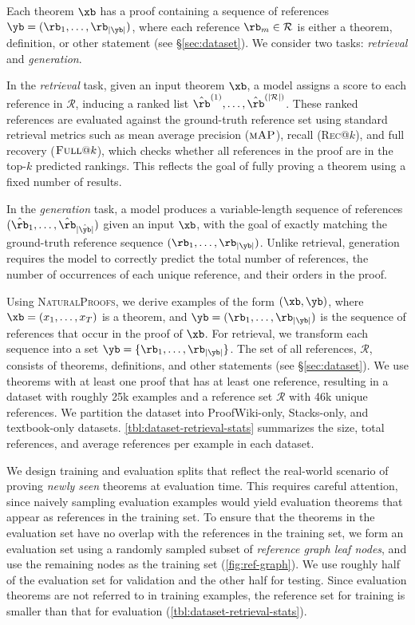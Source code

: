 Each theorem $\xb$ has a proof containing a sequence of references $\yb=(\rb_1,\ldots,\rb_{|\yb|})$, where each reference $\rb_m\in \mathcal{R}$ is either a theorem, definition, or other statement (see \S\ref{sec:dataset}).
We consider two tasks: \textit{retrieval} and \textit{generation}.

In the \textit{retrieval} task, given an input theorem $\xb$, a model assigns a score to each reference in $\mathcal{R}$, inducing a ranked list $\hat{\rb}^{(1)},\ldots,\hat{\rb}^{(|\mathcal{R}|)}$.
These ranked references are evaluated against the ground-truth reference set using standard retrieval metrics such as mean average precision ($\textsc{mAP}$), recall (\textsc{Rec}@$k$), and full recovery ($\textsc{Full}@k$), which checks whether all references in the proof are in the top-$k$ predicted rankings. 
This reflects the goal of fully proving a theorem using a fixed number of results.

In the \textit{generation} task, a model produces a variable-length sequence of references $(\hat{\rb}_1,\ldots,\hat{\rb}_{|\hat{\yb}|})$ given an input $\xb$, with the goal of exactly matching the ground-truth reference sequence $(\rb_1,\ldots,\rb_{|\yb|})$.
Unlike retrieval, generation requires the model to correctly predict the total number of references, the number of occurrences of each unique reference, and their orders in the proof.

Using \textsc{NaturalProofs}, we derive examples of the  form $(\xb,\yb)$, where $\xb=(x_1,\ldots,x_T)$ is a theorem, and $\yb=(\rb_1,\ldots,\rb_{|\yb|})$ is the sequence of references that occur in the proof of $\xb$.
For retrieval, we transform each sequence into a set $\yb=\{\rb_1,\ldots,\rb_{|\yb|}\}$.
The set of all references, $\mathcal{R}$, consists of theorems, definitions, and other statements (see \S\ref{sec:dataset}).
We use theorems with at least one proof that has at least one reference, 
resulting in a dataset with roughly 25k examples and a reference set $\mathcal{R}$ with 46k unique references.
We partition the dataset into ProofWiki-only, Stacks-only, and textbook-only datasets.
\autoref{tbl:dataset-retrieval-stats} summarizes the size, total references, and average references per example in each dataset.

We design training and evaluation splits that reflect the real-world scenario of proving \textit{newly seen} theorems at evaluation time.
This requires careful attention, since 
naively sampling evaluation examples would yield evaluation theorems that appear as references in the training set.
To ensure that the theorems in the evaluation set have no overlap with the references in the training set,
we form an evaluation set using a randomly sampled subset of \textit{reference graph leaf nodes}, and use the remaining nodes as the training set (\autoref{fig:ref-graph}).
We use roughly half of the evaluation set for validation and the other half for testing.
Since evaluation theorems are not referred to in training examples, the reference set for training is smaller than that for evaluation (\autoref{tbl:dataset-retrieval-stats}).

